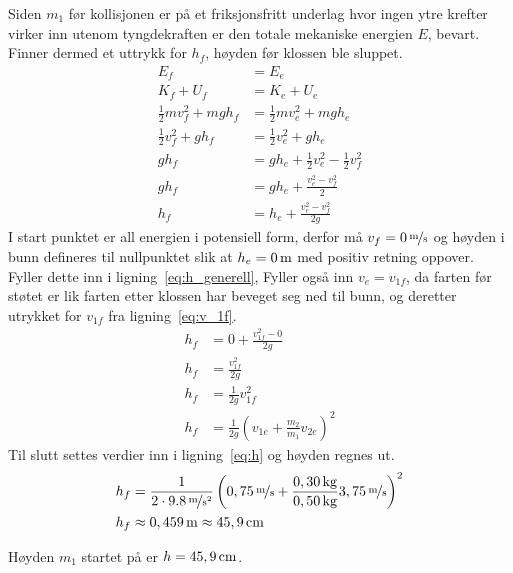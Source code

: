 \documentclass{article}
\begin{document}
\clearpage
Siden \(m_1\) før kollisjonen er på et friksjonsfritt underlag hvor ingen ytre krefter virker inn utenom tyngdekraften er den totale mekaniske energien \(E\), bevart. Finner dermed et uttrykk for \(h_f\), høyden før klossen ble sluppet.
\begin{equation}
\begin{split}
    E_f &= E_e \\
    K_f + U_f &= K_e + U_e \\
    \frac{1}{2} m v^2_f + mgh_f &= \frac{1}{2} m v^2_e + mgh_e \\
    \frac{1}{2} v^2_f + gh_f &= \frac{1}{2} v^2_e + gh_e \\
    gh_f &= gh_e + \frac{1}{2} v^2_e  - \frac{1}{2} v^2_f \\
    gh_f &= gh_e + \frac{v^2_e  - v^2_f}{2} \\
    h_f &= h_e + \frac{v^2_e  - v^2_f}{2g}
\end{split}
\label{eq:h_generell}
\end{equation}
I start punktet er all energien i potensiell form, derfor må \(v_f = \unitfrac[0]{m}{s}\) og høyden i bunn defineres til nullpunktet slik at \(h_e = \unit[0]{m}\) med positiv retning oppover. Fyller dette inn i ligning~\ref{eq:h_generell}, Fyller også inn \(v_e = v_{1f}\), da farten før støtet er lik farten etter klossen har beveget seg ned til bunn, og deretter utrykket for \(v_{1f}\) fra ligning~\ref{eq:v_1f}.
\begin{equation}
\begin{split}
    h_f &= 0 + \frac{v^2_{1f}  - 0}{2g} \\
    h_f &= \frac{v^2_{1f}}{2g} \\
    h_f &= \frac{1}{2g} v^2_{1f} \\
    h_f &= \frac{1}{2g} \left( v_{1e} + \frac{m_2}{m_1} v_{2e} \right)^2
\end{split}
\label{eq:h}
\end{equation}
Til slutt settes verdier inn i ligning~\ref{eq:h} og høyden regnes ut.
\begin{equation*}
\begin{split}
    h_f &= \frac{1}{2 \cdot \unitfrac[9.8]{m}{s^2}} \left( \unitfrac[0,75]{m}{s} + \frac{\unit[0,30]{kg} }{\unit[0,50]{kg}} \unitfrac[3,75]{m}{s}\right)^2 \\
    h_f &\approx \unit[0,459]{m} \approx \unit[45,9]{cm}
\end{split}
\end{equation*}

Høyden \(m_1\) startet på er \underline{\underline{\(h = \unit[45,9]{cm}\)}}.
\end{document}
